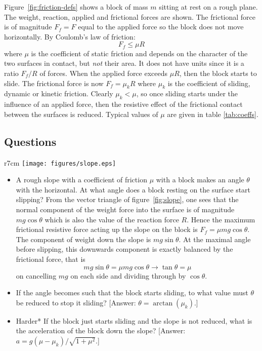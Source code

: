 \vspace{-.3cm}
Figure~\ref{fig:friction-defs} shows a block of mass $m$ sitting at rest on a rough plane. The weight, reaction, applied and frictional forces are shown.  The frictional force is of magnitude $F_f = F$ equal to the applied force so the block does not move horizontally.  By Coulomb's law of friction:
 \begin{equation*} F_f  \le \mu R
\end{equation*}
where $\mu$ is the coefficient of static friction and depends on the character of the two surfaces in contact, but \textit{not} their area.  It does not have units since it is a ratio $F_f/R$ of forces.
\nll
When the applied force exceeds $\mu R$, then the block starts to slide.  The frictional force is now $F_f = \mu_k R$ where $\mu_k$ is the coefficient of sliding, dynamic or kinetic friction.  Clearly $\mu_k < \mu$, so once sliding starts under the influence of an applied force, then the resistive effect of the frictional contact between the surfaces is reduced.\nll 
Typical values of $\mu$ are given in table \ref{tab:coeffs}.
\subsection*{Questions}
 \begin{wrapfigure}{r}{7cm}\vspace{-2.7cm}
\center
\texttt{[image: figures/slope.eps]}
\caption{A rough slope inclined at angle $\theta$ to the horizontal with a block of mass $m$ resting on it.  The vector triangle resolves the weight force parallel and perpendicular to the slope.}
\label{fig:slope}
\end{wrapfigure}
\begin{itemize}
\item[1.] A rough slope with a coefficient of friction $\mu$ with a block makes an angle $\theta$ with the horizontal.  At what angle does a block resting on the surface start slipping?\nll
From the vector triangle of figure~\ref{fig:slope}, one sees that the normal component of the weight force into the surface is of magnitude $mg\cos\theta$ which is also the value of the reaction force $R$.  Hence the maximum frictional resistive force acting up the slope on the block is $F_f = \mu mg \cos\theta$.  The component of weight down the slope is $mg\sin\theta$.  At the maximal angle before slipping, this downwards component is exactly balanced by the frictional force, that is
\begin{equation*} 
mg\sin\theta = \mu mg \cos\theta \rightarrow \tan\theta = \mu
\end{equation*}
on cancelling  $mg$ on each side and dividing through by $\cos\theta$.
\item[2.] If the angle becomes such that the block starts sliding, to what value must $\theta$ be reduced to stop it sliding?  [Answer: $\theta = \arctan(\mu_k)$.]
\item[3.] Harder* If the block just starts sliding and the slope is not reduced, what is the acceleration of the block down the slope? [Answer: $a = g(\mu -\mu_k)/\sqrt{1 + \mu^2}$.]
 \end{itemize} 

